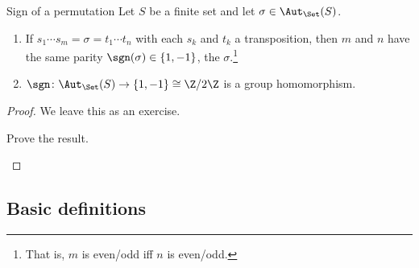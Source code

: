 \begin{thm}{Sign of a permutation}{}
	Let $S$ be a finite set and let $\sigma \in \Aut _{\Set}(S)$.
	\begin{enumerate}
		\item If $s_1\cdots s_m=\sigma =t_1\cdots t_n$ with each $s_k$ and $t_k$ a transposition, then $m$ and $n$ have the same parity $\sgn (\sigma )\in \{ 1,-1\}$\index[notation]{$\sgn (\sigma )$}, the  $\sigma$.\footnote{That is, $m$ is even/odd iff $n$ is even/odd.}
		\item $\sgn \colon \Aut _{\Set}(S)\rightarrow \{ 1,-1\} \cong \Z /2\Z$ is a group homomorphism.
	\end{enumerate}
	\begin{proof}
		We leave this as an exercise.
		\begin{exr}[breakable=false]{}{}
			Prove the result.
		\end{exr}
	\end{proof}
\end{thm}

\subsection{Basic definitions}

